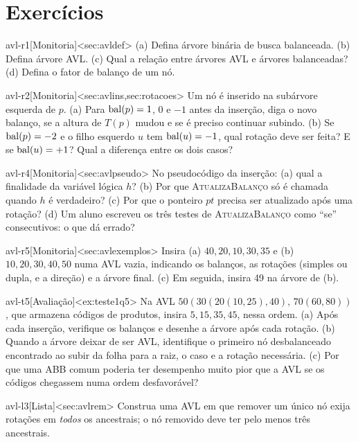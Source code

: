 \section{Exercícios}
\excurso
\begin{exercicio}{avl-r1}[Monitoria]<sec:avldef>
(a) Defina árvore binária de busca balanceada. (b) Defina árvore AVL. (c) Qual a relação entre árvores AVL e árvores balanceadas? (d) Defina o fator de balanço de um nó.
\end{exercicio}
\begin{exercicio}{avl-r2}[Monitoria]<sec:avlins,sec:rotacoes>
Um nó é inserido na subárvore esquerda de $p$. (a) Para $\operatorname{bal}(p)=1$, $0$ e $-1$ antes da inserção, diga o novo balanço, se a altura de $T(p)$ mudou e se é preciso continuar subindo. (b) Se $\operatorname{bal}(p)=-2$ e o filho esquerdo $u$ tem $\operatorname{bal}(u)=-1$, qual rotação deve ser feita? E se $\operatorname{bal}(u)=+1$? Qual a diferença entre os dois casos?
\end{exercicio}
\begin{exercicio}{avl-r4}[Monitoria]<sec:avlpseudo>
No pseudocódigo da inserção: (a) qual a finalidade da variável lógica $h$? (b) Por que \textsc{AtualizaBalanço} só é chamada quando $h$ é verdadeiro? (c) Por que o ponteiro $pt$ precisa ser atualizado após uma rotação? (d) Um aluno escreveu os três testes de \textsc{AtualizaBalanço} como ``se'' consecutivos: o que dá errado?
\end{exercicio}
\begin{exercicio}{avl-r5}[Monitoria]<sec:avlexemplos>
Insira (a) $40,20,10,30,35$ e (b) $10,20,30,40,50$ numa AVL vazia, indicando os balanços, as rotações (simples ou dupla, e a direção) e a árvore final. (c) Em seguida, insira 49 na árvore de (b).
\end{exercicio}
\begin{exercicio}{avl-t5}[Avaliação]<ex:teste1q5>
Na AVL $50(30(20(10,25),40),\,70(60,80))$, que armazena códigos de produtos, insira $5,15,35,45$, nessa ordem. (a) Após cada inserção, verifique os balanços e desenhe a árvore após cada rotação. (b) Quando a árvore deixar de ser AVL, identifique o primeiro nó desbalanceado encontrado ao subir da folha para a raiz, o caso e a rotação necessária. (c) Por que uma ABB comum poderia ter desempenho muito pior que a AVL se os códigos chegassem numa ordem desfavorável?
\end{exercicio}
\begin{exercicio}{avl-l3}[Lista]<sec:avlrem>
Construa uma AVL em que remover um único nó exija rotações em \emph{todos} os ancestrais; o nó removido deve ter pelo menos três ancestrais.
\end{exercicio}
